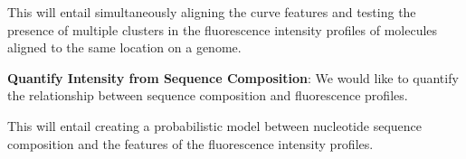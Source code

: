 \begin{tcolorbox}[colback=green!5,colframe=green!40!black,title=Statistical challenge] %
This will entail simultaneously aligning the curve features and testing the presence of multiple clusters in the fluorescence intensity profiles of molecules aligned to the same location on a genome.
\end{tcolorbox}

{\bf{Quantify Intensity from Sequence Composition}}: We would like to quantify the relationship between sequence composition and fluorescence profiles.

\begin{tcolorbox}[colback=green!5,colframe=green!40!black,title=Statistical challenge] %
This will entail creating a probabilistic model between nucleotide sequence composition and the features of the fluorescence intensity profiles.
\end{tcolorbox}



